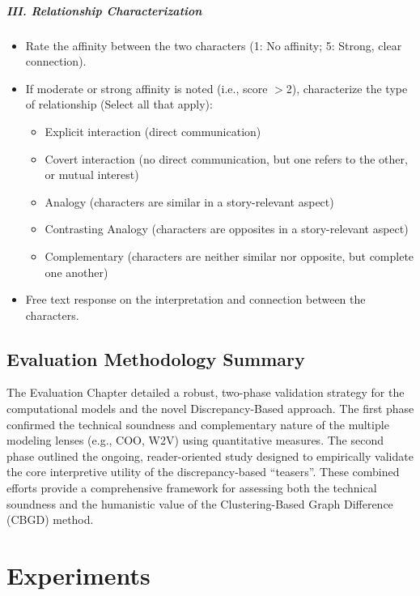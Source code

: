 \documentclass[a4paper,12pt]{report}
\begin{document}
\paragraph{III. Relationship Characterization}
\begin{itemize}
    \item Rate the affinity between the two characters (1: No affinity; 5: Strong, clear connection).
    \item If moderate or strong affinity is noted (i.e., score $>$2), characterize the type of relationship (Select all that apply):
    \begin{itemize}
        \item Explicit interaction (direct communication)
        \item Covert interaction (no direct communication, but one refers to the other, or mutual interest)
        \item Analogy (characters are similar in a story-relevant aspect)
        \item Contrasting Analogy (characters are opposites in a story-relevant aspect)
        \item Complementary (characters are neither similar nor opposite, but complete one another)
    \end{itemize}
    \item Free text response on the interpretation and connection between the characters.
\end{itemize}
\clearpage
\section{Evaluation Methodology Summary}
\label{sec:summary}

The Evaluation Chapter detailed a robust, two-phase validation strategy for the computational models and the novel Discrepancy-Based approach. The first phase confirmed the technical soundness and complementary nature of the multiple modeling lenses (e.g., COO, W2V) using quantitative measures. The second phase outlined the ongoing, reader-oriented study designed to empirically validate the core interpretive utility of the discrepancy-based \textquotedblleft teasers\textquotedblright{}. These combined efforts provide a comprehensive framework for assessing both the technical soundness and the humanistic value of the Clustering-Based Graph Difference (CBGD) method.


\chapter{Experiments}
\label{chap:experiments}
\end{document}
